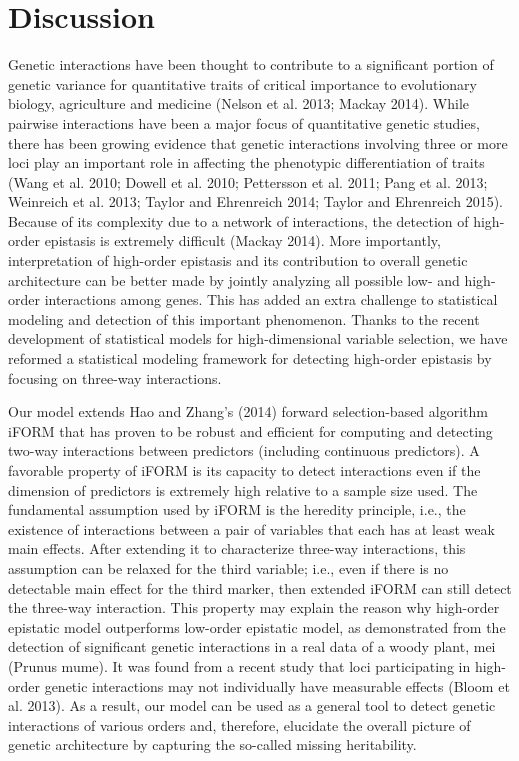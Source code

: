 \documentclass[11pt,]{book}
\theoremstyle{definition}
\theoremstyle{definition}
\theoremstyle{remark}
\begin{document}
\section{Discussion}\label{discussion-1}

Genetic interactions have been thought to contribute to a significant
portion of genetic variance for quantitative traits of critical
importance to evolutionary biology, agriculture and medicine (Nelson et
al. 2013; Mackay 2014). While pairwise interactions have been a major
focus of quantitative genetic studies, there has been growing evidence
that genetic interactions involving three or more loci play an important
role in affecting the phenotypic differentiation of traits (Wang et al.
2010; Dowell et al. 2010; Pettersson et al. 2011; Pang et al. 2013;
Weinreich et al. 2013; Taylor and Ehrenreich 2014; Taylor and Ehrenreich
2015). Because of its complexity due to a network of interactions, the
detection of high-order epistasis is extremely difficult (Mackay 2014).
More importantly, interpretation of high-order epistasis and its
contribution to overall genetic architecture can be better made by
jointly analyzing all possible low- and high-order interactions among
genes. This has added an extra challenge to statistical modeling and
detection of this important phenomenon. Thanks to the recent development
of statistical models for high-dimensional variable selection, we have
reformed a statistical modeling framework for detecting high-order
epistasis by focusing on three-way interactions.

Our model extends Hao and Zhang's (2014) forward selection-based
algorithm iFORM that has proven to be robust and efficient for computing
and detecting two-way interactions between predictors (including
continuous predictors). A favorable property of iFORM is its capacity to
detect interactions even if the dimension of predictors is extremely
high relative to a sample size used. The fundamental assumption used by
iFORM is the heredity principle, i.e., the existence of interactions
between a pair of variables that each has at least weak main effects.
After extending it to characterize three-way interactions, this
assumption can be relaxed for the third variable; i.e., even if there is
no detectable main effect for the third marker, then extended iFORM can
still detect the three-way interaction. This property may explain the
reason why high-order epistatic model outperforms low-order epistatic
model, as demonstrated from the detection of significant genetic
interactions in a real data of a woody plant, mei (Prunus mume). It was
found from a recent study that loci participating in high-order genetic
interactions may not individually have measurable effects (Bloom et al.
2013). As a result, our model can be used as a general tool to detect
genetic interactions of various orders and, therefore, elucidate the
overall picture of genetic architecture by capturing the so-called
missing heritability.
\end{document}
